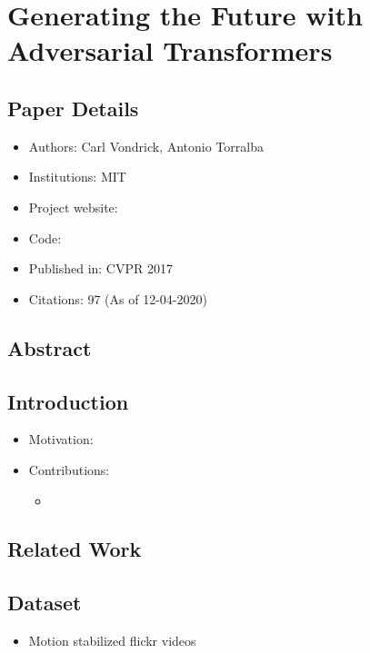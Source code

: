 \documentclass{article}
\begin{document}
    \section{Generating the Future with Adversarial Transformers}\label{sec:Generating_the_Future_with_Adversarial_Transformers}
    \subsection*{Paper Details}
    \begin{itemize}
        \item Authors: Carl Vondrick, Antonio Torralba
        \item Institutions: MIT
        \item Project website:
        \item Code:
        \item Published in: CVPR 2017
        \item Citations: 97 (As of 12-04-2020)
    \end{itemize}

    \subsection*{Abstract}

    \subsection{Introduction}\label{subsec:Generating_the_Future_with_Adversarial_Transformers:introduction}
    \begin{itemize}
        \item Motivation:
        \item Contributions:
        \begin{itemize}
            \item
        \end{itemize}
    \end{itemize}

    \subsection{Related Work}\label{subsec:Generating_the_Future_with_Adversarial_Transformers:related-work}

    \subsection{Dataset}\label{subsec:Generating_the_Future_with_Adversarial_Transformers:dataset}
    \begin{itemize}
        \item Motion stabilized flickr videos
    \end{itemize}
\end{document}
